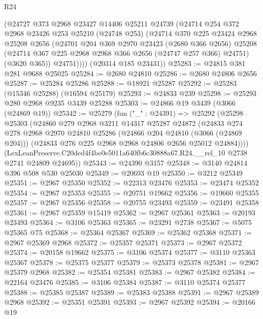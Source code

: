 \begin{lexlean}{R24}
\begin{coremodule}
        (@24727
          @373
          @2968
          @23427
          @14406
          @25211
          @24739
          (@24714
            @254
            @372
            @2968
            @23426
            @253
            @25210
            (@24748 @253)
            (@24714
              @370
              @225
              @23424
              @2968
              @25208
              @2656
              (@24701
                @204
                @369
                @2970
                @23423
                (@2680 @366 @2656)
                @25208
                (@24714 @367 @225 @2968 @2968 @366 @2656 (@24747 @257 @366) @24751)
                (@3620 @365))
              @24751))))
      (@20314 @185 @23431))
@25283 := @24815 @381 @281 @9688 @25025
@25284 := @2680 @24810
@25286 := @2680 @24806 @2656
@25287 := @25284 @25286
@25288 := @18921 @25287
@25292 := @25283 (@15346 @25288) (@16594 @25179)
@25293 := @24833 @239
@25298 := @25293 @280 @2968 @9235 @3439 @25288
@25303 := @24866 @19 @3439 (@3066 (@24869 @19))
@25342 := @25279
    (fun ("_" : @24391) =>
    @25292
      (@25298
        @25303
        (@24860
          @279
          @2968
          @3211
          @14317
          @25287
          @24872
          (@24833
            @274
            @278
            @2968
            @2970
            @24810
            @25286
            (@24866 @204 @24810 (@3066 (@24869 @204)))
            (@24833 @276 @225 @2968 @2968 @24806 @2656 @25012 @24884))))
      (LexLeanPreserve.C20ded4f4be0e5011a640fb6c30888a67.R24.__rel_10 @2738 @2741 @24809 @24695))
@25343 := @24390 @3157
@25348 := @3140 @24814 @396 @508 @530 @25030
@25349 := @20693 @19
@25350 := @3212 @25349
@25351 := @2967 @25350
@25352 := @22313 @23476
@25353 := @23474 @25352
@25354 := @2967 @25353
@25355 := @20751 @19662
@25356 := @19660 @25355
@25357 := @2967 @25356
@25358 := @20755 @23493
@25359 := @23491 @25358
@25361 := @2967 @25359 @15419
@25362 := @2967 @25361
@25363 := @20193 @23493
@25364 := @3106 @25363
@25365 := @23291 @2738
@25367 := @5075 @25365 @75
@25368 := @25364 @25367
@25369 := @25362 @25368
@25371 := @2967 @25369 @2968
@25372 := @25357 @25371
@25373 := @2967 @25372
@25374 := @20158 @19662
@25375 := @3106 @25374
@25377 := @3110 @25363 @25367
@25378 := @25375 @25377
@25379 := @25373 @25378
@25381 := @2967 @25379 @2968
@25382 := @25354 @25381
@25383 := @2967 @25382
@25384 := @22164 @23476
@25385 := @3106 @25384
@25387 := @3110 @25374 @25377
@25388 := @25385 @25387
@25389 := @25383 @25388
@25391 := @2967 @25389 @2968
@25392 := @25351 @25391
@25393 := @2967 @25392
@25394 := @20166 @19

\end{coremodule}
\end{lexlean}
